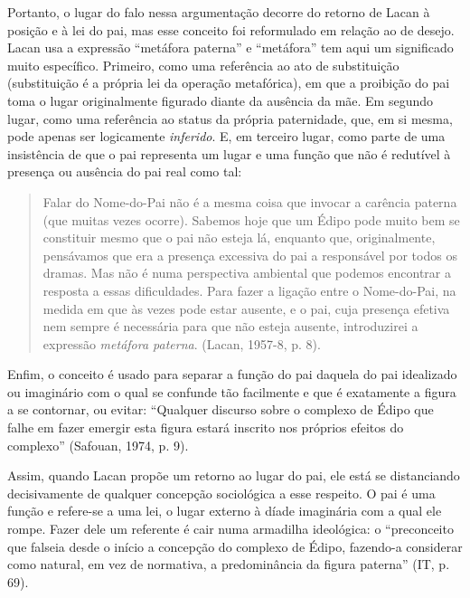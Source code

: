 Portanto, o lugar do falo nessa argumentação decorre do retorno de Lacan
à posição e à lei do pai, mas esse conceito foi reformulado em relação
ao de desejo. Lacan usa a expressão ``metáfora paterna'' e ``metáfora''
tem aqui um significado muito específico. Primeiro, como uma referência
ao ato de substituição (substituição é a própria lei da operação
metafórica), em que a proibição do pai toma o lugar originalmente
figurado diante da ausência da mãe. Em segundo lugar, como uma
referência ao status da própria paternidade, que, em si mesma, pode
apenas ser logicamente \emph{inferido}. E, em terceiro lugar, como parte
de uma insistência de que o pai representa um lugar e uma função que não
é redutível à presença ou ausência do pai real como tal:

\begin{quote}
Falar do Nome-do-Pai não é a mesma coisa que invocar a carência paterna
(que muitas vezes ocorre). Sabemos hoje que um Édipo pode muito bem se
constituir mesmo que o pai não esteja lá, enquanto que, originalmente,
pensávamos que era a presença excessiva do pai a responsável por todos
os dramas. Mas não é numa perspectiva ambiental que podemos encontrar a
resposta a essas dificuldades. Para fazer a ligação entre o Nome-do-Pai,
na medida em que às vezes pode estar ausente, e o pai, cuja presença
efetiva nem sempre é necessária para que não esteja ausente,
introduzirei a expressão \emph{metáfora paterna}. (Lacan, 1957-8, p. 8).
\end{quote}

Enfim, o conceito é usado para separar a função do pai daquela do pai
idealizado ou imaginário com o qual se confunde tão facilmente e que é
exatamente a figura a se contornar, ou evitar: ``Qualquer discurso sobre
o complexo de Édipo que falhe em fazer emergir esta figura estará
inscrito nos próprios efeitos do complexo'' (Safouan, 1974, p. 9).

Assim, quando Lacan propõe um retorno ao lugar do pai, ele está se
distanciando decisivamente de qualquer concepção sociológica a esse
respeito. O pai é uma função e refere-se a uma lei, o lugar externo à
díade imaginária com a qual ele rompe. Fazer dele um referente é cair
numa armadilha ideológica: o ``preconceito que falseia desde o início a
concepção do complexo de Édipo, fazendo-a considerar como natural, em
vez de normativa, a predominância da figura paterna'' (IT, p. 69).


